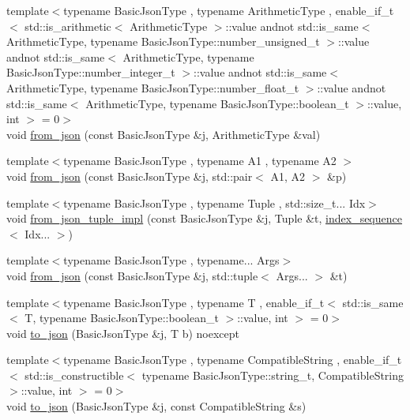 \begin{DoxyCompactItemize}
\item 
{\footnotesize template$<$typename Basic\+Json\+Type , typename Arithmetic\+Type , enable\+\_\+if\+\_\+t$<$ std\+::is\+\_\+arithmetic$<$ Arithmetic\+Type $>$\+::value andnot std\+::is\+\_\+same$<$ Arithmetic\+Type, typename Basic\+Json\+Type\+::number\+\_\+unsigned\+\_\+t $>$\+::value andnot std\+::is\+\_\+same$<$ Arithmetic\+Type, typename Basic\+Json\+Type\+::number\+\_\+integer\+\_\+t $>$\+::value andnot std\+::is\+\_\+same$<$ Arithmetic\+Type, typename Basic\+Json\+Type\+::number\+\_\+float\+\_\+t $>$\+::value andnot std\+::is\+\_\+same$<$ Arithmetic\+Type, typename Basic\+Json\+Type\+::boolean\+\_\+t $>$\+::value, int $>$  = 0$>$ }\\void \hyperlink{namespacenlohmann_1_1detail_a839b0ab50d2c9bce669068f56bc41202}{from\+\_\+json} (const Basic\+Json\+Type \&j, Arithmetic\+Type \&val)
\item 
{\footnotesize template$<$typename Basic\+Json\+Type , typename A1 , typename A2 $>$ }\\void \hyperlink{namespacenlohmann_1_1detail_aae9f9c2601074e323d49428132cc293d}{from\+\_\+json} (const Basic\+Json\+Type \&j, std\+::pair$<$ A1, A2 $>$ \&p)
\item 
{\footnotesize template$<$typename Basic\+Json\+Type , typename Tuple , std\+::size\+\_\+t... Idx$>$ }\\void \hyperlink{namespacenlohmann_1_1detail_a28253915d9db4a0112d60eaee0422949}{from\+\_\+json\+\_\+tuple\+\_\+impl} (const Basic\+Json\+Type \&j, Tuple \&t, \hyperlink{structnlohmann_1_1detail_1_1index__sequence}{index\+\_\+sequence}$<$ Idx... $>$)
\item 
{\footnotesize template$<$typename Basic\+Json\+Type , typename... Args$>$ }\\void \hyperlink{namespacenlohmann_1_1detail_a8b99ec9b29f3f20a18fc4281fb784e49}{from\+\_\+json} (const Basic\+Json\+Type \&j, std\+::tuple$<$ Args... $>$ \&t)
\item 
{\footnotesize template$<$typename Basic\+Json\+Type , typename T , enable\+\_\+if\+\_\+t$<$ std\+::is\+\_\+same$<$ T, typename Basic\+Json\+Type\+::boolean\+\_\+t $>$\+::value, int $>$  = 0$>$ }\\void \hyperlink{namespacenlohmann_1_1detail_a1a804b98cbe89b7e44b698f2ca860490}{to\+\_\+json} (Basic\+Json\+Type \&j, T b) noexcept
\item 
{\footnotesize template$<$typename Basic\+Json\+Type , typename Compatible\+String , enable\+\_\+if\+\_\+t$<$ std\+::is\+\_\+constructible$<$ typename Basic\+Json\+Type\+::string\+\_\+t, Compatible\+String $>$\+::value, int $>$  = 0$>$ }\\void \hyperlink{namespacenlohmann_1_1detail_a7356ed05cdbbb080cee80e1211e1c6c9}{to\+\_\+json} (Basic\+Json\+Type \&j, const Compatible\+String \&s)

\end{DoxyCompactItemize}
